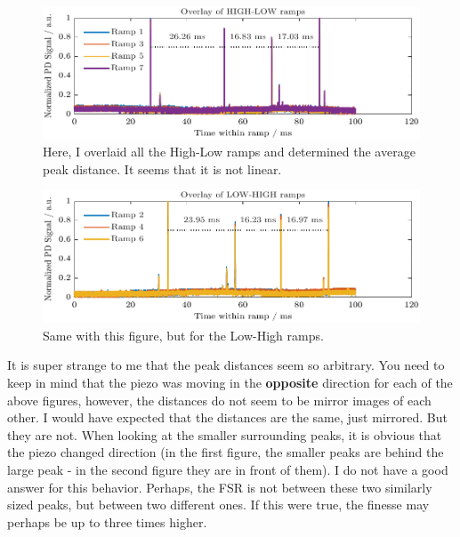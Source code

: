 \documentclass[a4paper,11pt]{article}
\begin{document}
\newpage

\begin{figure}[H]
    \centering
    \includegraphics[width=\textwidth]{ManyRamp/HiLo.pdf}
    \caption{Here, I overlaid all the High-Low ramps and determined the average peak distance. It seems that it is not linear.}
\end{figure}

\begin{figure}[H]
    \centering
    \includegraphics[width=\textwidth]{ManyRamp/LoHi.pdf}
    \caption{Same with this figure, but for the Low-High ramps.}
\end{figure}

It is super strange to me that the peak distances seem so arbitrary. 
You need to keep in mind that the piezo was moving in the \textbf{opposite} direction for each of the above figures, however, the distances do not seem to be mirror images of each other.
I would have expected that the distances are the same, just mirrored. But they are not.
When looking at the smaller surrounding peaks, it is obvious that the piezo changed direction (in the first figure, the smaller peaks are behind the large peak - in the second figure they are in front of them).
I do not have a good answer for this behavior. Perhaps, the FSR is not between these two similarly sized peaks, but between two different ones.
If this were true, the finesse may perhaps be up to three times higher.
\newpage
\end{document}
